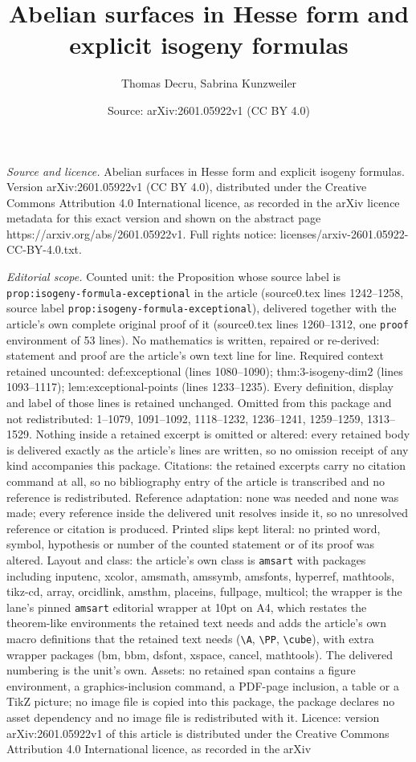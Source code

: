 \documentclass[10pt,a4paper]{amsart}
\title[Abelian surfaces in Hesse form and explicit isogeny formulas]{Abelian surfaces in Hesse form and explicit isogeny formulas}
\author{Thomas Decru, Sabrina Kunzweiler}
\date{Source: arXiv:2601.05922v1 (CC BY 4.0)}
\begin{document}
\maketitle

\noindent\emph{Source and licence.} Abelian surfaces in Hesse form and explicit isogeny formulas. Version arXiv:2601.05922v1 (CC BY 4.0), distributed under the Creative Commons Attribution 4.0 International licence, as recorded in the arXiv licence metadata for this exact version and shown on the abstract page https://arxiv.org/abs/2601.05922v1. Full rights notice: licenses/arxiv-2601.05922-CC-BY-4.0.txt.\par\smallskip

\noindent\textit{Editorial scope.} Counted unit: the Proposition whose source label is \texttt{prop:isogeny-formula-exceptional} in the article (source0.tex lines 1242--1258, source label \texttt{prop:isogeny-formula-exceptional}), delivered together with the article's own complete original proof of it (source0.tex lines 1260--1312, one \texttt{proof} environment of 53 lines). No mathematics is written, repaired or re-derived: statement and proof are the article's own text line for line. Required context retained uncounted: def:exceptional (lines 1080--1090); thm:3-isogeny-dim2 (lines 1093--1117); lem:exceptional-points (lines 1233--1235). Every definition, display and label of those lines is retained unchanged. Omitted from this package and not redistributed: 1--1079, 1091--1092, 1118--1232, 1236--1241, 1259--1259, 1313--1529. Nothing inside a retained excerpt is omitted or altered: every retained body is delivered exactly as the article's lines are written, so no omission receipt of any kind accompanies this package. Citations: the retained excerpts carry no citation command at all, so no bibliography entry of the article is transcribed and no reference is redistributed. Reference adaptation: none was needed and none was made; every reference inside the delivered unit resolves inside it, so no unresolved reference or citation is produced. Printed slips kept literal: no printed word, symbol, hypothesis or number of the counted statement or of its proof was altered. Layout and class: the article's own class is \texttt{amsart} with packages including inputenc, xcolor, amsmath, amssymb, amsfonts, hyperref, mathtools, tikz-cd, array, orcidlink, amsthm, placeins, fullpage, multicol; the wrapper is the lane's pinned \texttt{amsart} editorial wrapper at 10pt on A4, which restates the theorem-like environments the retained text needs and adds the article's own macro definitions that the retained text needs (\texttt{\textbackslash A}, \texttt{\textbackslash PP}, \texttt{\textbackslash cube}), with extra wrapper packages (bm, bbm, dsfont, xspace, cancel, mathtools). The delivered numbering is the unit's own. Assets: no retained span contains a figure environment, a graphics-inclusion command, a PDF-page inclusion, a table or a TikZ picture; no image file is copied into this package, the package declares no asset dependency and no image file is redistributed with it. Licence: version arXiv:2601.05922v1 of this article is distributed under the Creative Commons Attribution 4.0 International licence, as recorded in the arXiv 
\end{document}
